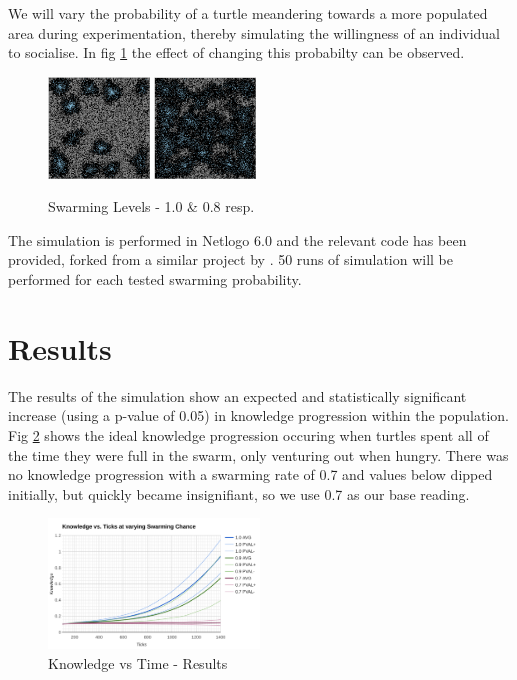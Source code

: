 \documentclass[a4paper,12pt,twocolumn]{report}
\begin{document}
We will vary the probability of a turtle meandering towards a more populated area during experimentation, thereby simulating the willingness of an individual to socialise. In fig \ref{fig:swarming} the effect of changing this probabilty can be observed.

\begin{figure}[b]
 \includegraphics[width=0.24\textwidth]{swarming-high}
 \includegraphics[width=0.24\textwidth]{swarming-low}
 \caption{Swarming Levels - 1.0 \& 0.8 resp.}
 \label{fig:swarming}
\end{figure}

The simulation is performed in Netlogo 6.0 and the relevant code has been provided, forked from a similar project by \cite{vcavce2007agent}. 50 runs of simulation will be performed for each tested swarming probability.

\section{Results}

The results of the simulation show an expected and statistically significant increase (using a p-value of 0.05) in knowledge progression within the population. Fig \ref{fig:table} shows the ideal knowledge progression occuring when turtles spent all of the time they were full in the swarm, only venturing out when hungry. There was no knowledge progression with a swarming rate of 0.7 and values below dipped initially, but quickly became insignifiant, so we use 0.7 as our base reading.

\begin{figure}
 \includegraphics[width=0.5\textwidth]{swarming-effect}
 \caption{Knowledge vs Time - Results}
 \label{fig:table}
\end{figure}
\end{document}
